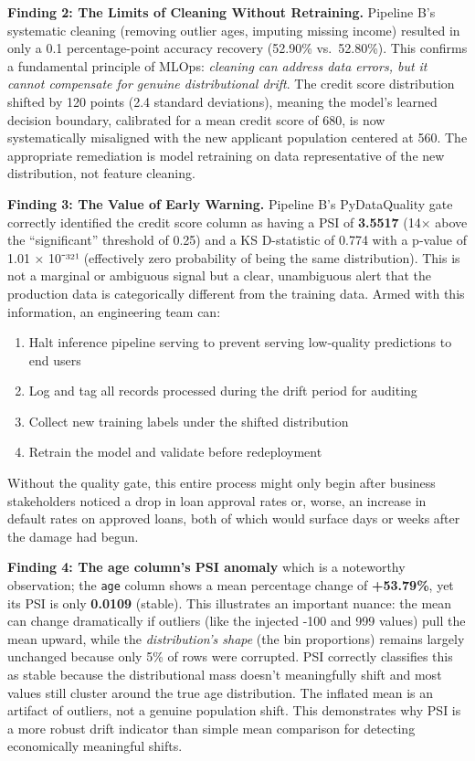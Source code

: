 \documentclass{article}
\begin{document}
\textbf{Finding 2: The Limits of Cleaning Without Retraining.} Pipeline
B's systematic cleaning (removing outlier ages, imputing missing income)
resulted in only a 0.1 percentage-point accuracy recovery (52.90\%
vs.~52.80\%). This confirms a fundamental principle of MLOps:
\emph{cleaning can address data errors, but it cannot compensate for
genuine distributional drift}. The credit score distribution shifted by
120 points (2.4 standard deviations), meaning the model's learned
decision boundary, calibrated for a mean credit score of 680, is now
systematically misaligned with the new applicant population centered at
560. The appropriate remediation is model retraining on data
representative of the new distribution, not feature cleaning.

\textbf{Finding 3: The Value of Early Warning.} Pipeline B's
PyDataQuality gate correctly identified the credit score column as
having a PSI of \textbf{3.5517} (14× above the ``significant'' threshold
of 0.25) and a KS D-statistic of 0.774 with a p-value of 1.01 × 10⁻³²¹
(effectively zero probability of being the same distribution). This is
not a marginal or ambiguous signal but a clear, unambiguous alert that
the production data is categorically different from the training data.
Armed with this information, an engineering team can:

\begin{enumerate}
\def\labelenumi{\arabic{enumi}.}
\item
  Halt inference pipeline serving to prevent serving low-quality
  predictions to end users
\item
  Log and tag all records processed during the drift period for auditing
\item
  Collect new training labels under the shifted distribution
\item
  Retrain the model and validate before redeployment
\end{enumerate}

Without the quality gate, this entire process might only begin after
business stakeholders noticed a drop in loan approval rates or, worse,
an increase in default rates on approved loans, both of which would
surface days or weeks after the damage had begun.

\textbf{Finding 4: The age column's PSI anomaly} which is a noteworthy
observation; the \texttt{age} column shows a mean percentage change of
\textbf{+53.79\%}, yet its PSI is only \textbf{0.0109} (stable). This
illustrates an important nuance: the mean can change dramatically if
outliers (like the injected -100 and 999 values) pull the mean upward,
while the \emph{distribution's shape} (the bin proportions) remains
largely unchanged because only 5\% of rows were corrupted. PSI correctly
classifies this as stable because the distributional mass doesn't
meaningfully shift and most values still cluster around the true age
distribution. The inflated mean is an artifact of outliers, not a
genuine population shift. This demonstrates why PSI is a more robust
drift indicator than simple mean comparison for detecting economically
meaningful shifts.
\end{document}
